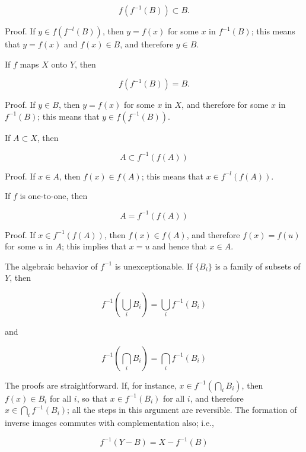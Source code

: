 \begin{equation*} 
f(f^{-1}(B)) \subset B.
\end{equation*}

Proof. If $y \in f(f^{-l}(B))$, then $y = f(x)$ for some $x$ in $f^{-1}(B)$; this means that $y = f(x)$ and $f(x) \in B$, and therefore $y \in B$. 

If $f$ maps $X$ onto $Y$, then 

\begin{equation*} 
f(f^{-1}(B)) = B.
\end{equation*}

Proof. If $y \in B$, then $y = f(x)$ for some $x$ in $X$, and therefore for some $x$ in $f^{-1}(B)$; this means that $y \in f(f^{-1}(B))$. 

If $A \subset X$, then 

\begin{equation*}
A \subset f^{-1}(f(A))
\end{equation*}

Proof. If $x \in A$, then $f(x) \in f(A)$; this means that $x \in f^{-l}(f(A))$.

If $f$ is one-to-one, then 

\begin{equation*}
A = f^{-1}(f(A))
\end{equation*}

Proof. If $x \in f^{-1}(f(A))$, then $f(x) \in f(A)$, and therefore $f(x) = f(u)$ for some $u$ in $A$; this implies that $x = u$ and hence that $x \in A$. 


The algebraic behavior of $f^{-1}$ is unexceptionable. If $ \{ B_{i} \} $ is a family of subsets of $Y$, then 

\begin{equation*}
f^{-1}( \bigcup_{i} B_{i} ) = \bigcup_{i}f^{-1}(B_{i})
\end{equation*}

and

\begin{equation*}
f^{-1}( \bigcap_{i} B_{i} ) = \bigcap_{i}f^{-1}(B_{i})
\end{equation*}

The proofs are straightforward. If, for instance, $x \in f^{-1}( \bigcap_{i} B_{i})$, then $f(x) \in B_{i}$ for all $i$, so that $x \in f^{-1}(B_{i})$ for all $i$, and therefore $x \in \bigcap_{i}f^{-1}(B_{i})$; all the steps in this argument are reversible. The formation of inverse images commutes with complementation also; i.e., 

\begin{equation*}
f^{-1}(Y - B) = X - f^{-1}(B)
\end{equation*}

